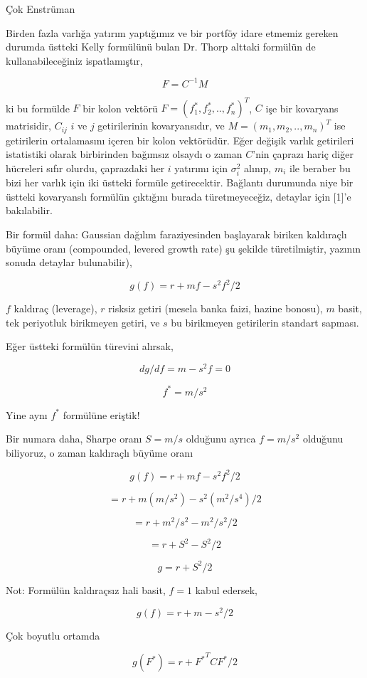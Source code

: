 \documentclass[12pt,fleqn]{article}\usepackage{../../common}
\begin{document}
Çok Enstrüman

Birden fazla varlığa yatırım yaptığımız ve bir portföy idare etmemiz
gereken durumda üstteki Kelly formülünü bulan Dr. Thorp alttaki formülün de
kullanabileceğiniz ispatlamıştır,

$$ F = C^{-1}M $$

ki bu formülde $F$ bir kolon vektörü $F = (f_1^\ast,f_2^\ast,..,f_n^\ast)^T$, $C$
işe bir kovaryans matrisidir, $C_{ij}$ $i$ ve $j$ getirilerinin
kovaryansıdır, ve $M = (m_1,m_2,..,m_n)^T$ ise getirilerin ortalamasını
içeren bir kolon vektörüdür. Eğer değişik varlık getirileri istatistiki
olarak birbirinden bağımsız olsaydı o zaman $C$'nin çaprazı hariç diğer
hücreleri sıfır olurdu, çaprazdaki her $i$ yatırımı için $\sigma_i^2$
alınıp, $m_i$ ile beraber bu bizi her varlık için iki üstteki formüle
getirecektir. Bağlantı durumunda niye bir üstteki kovaryanslı formülün
çıktığını burada türetmeyeceğiz, detaylar için [1]'e bakılabilir.

Bir formül daha: Gaussian dağılım faraziyesinden başlayarak biriken
kaldıraçlı büyüme oranı (compounded, levered growth rate) şu şekilde
türetilmiştir, yazının sonuda detaylar bulunabilir),

$$ g(f) = r + mf - s^2f^2 / 2 $$

$f$ kaldıraç (leverage), $r$ risksiz getiri (mesela banka faizi, hazine
bonosu), $m$ basit, tek periyotluk birikmeyen getiri, ve $s$ bu birikmeyen
getirilerin standart sapması. 

Eğer üstteki formülün türevini alırsak, 

$$ dg / df = m - s^2f = 0 $$

$$ f^\ast = m/s^2 $$

Yine aynı $f^\ast$ formülüne eriştik! 

Bir numara daha, Sharpe oranı $S = m/s$ olduğunu ayrıca $f=m/s^2$ olduğunu
biliyoruz, o zaman kaldıraçlı büyüme oranı

$$ g(f) = r + mf - s^2f^2 / 2 $$

$$  = r + m(m/s^2) - s^2(m^2/s^4) / 2 $$

$$  = r + m^2/s^2 - m^2/s^2 / 2 $$

$$  = r + S^2 - S^2/2 $$

$$ g = r +  S^2/2 $$

Not: Formülün kaldıraçsız hali basit, $f=1$ kabul edersek,

$$ g(f) = r + m - s^2/ 2 $$

Çok boyutlu ortamda 

$$ g(F^\ast) = r + {F^\ast}^TCF^\ast / 2 $$
\end{document}
